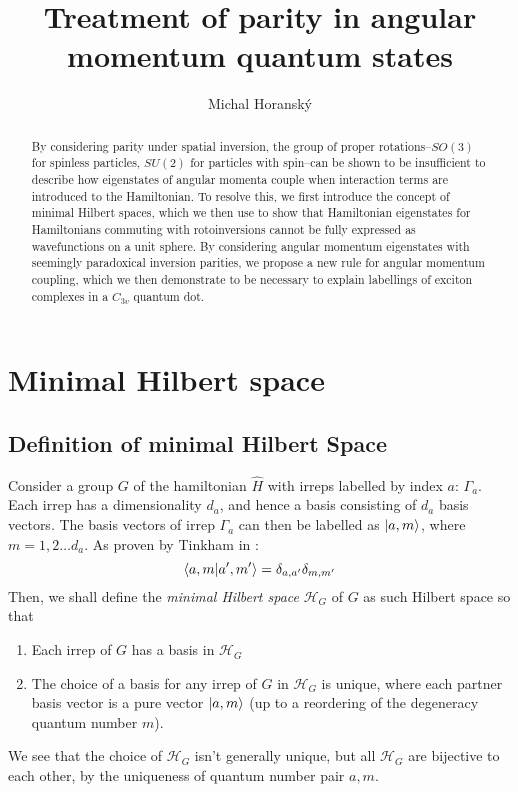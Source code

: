 \documentclass[12pt]{article}
\begin{document}
	\title{Treatment of parity in angular momentum quantum states}
	\author{Michal Horanský}
	\maketitle
	
	\begin{abstract}
	By considering parity under spatial inversion, the group of proper rotations--$SO(3)$ for spinless particles, $SU(2)$ for particles with spin--can be shown to be insufficient to describe how eigenstates of angular momenta couple when interaction terms are introduced to the Hamiltonian. To resolve this, we first introduce the concept of minimal Hilbert spaces, which we then use to show that Hamiltonian eigenstates for Hamiltonians commuting with rotoinversions cannot be fully expressed as wavefunctions on a unit sphere. By considering angular momentum eigenstates with seemingly paradoxical inversion parities, we propose a new rule for angular momentum coupling, which we then demonstrate to be necessary to explain labellings of exciton complexes in a $C_{3v}$ quantum dot.
	\end{abstract}
	
	\section{Minimal Hilbert space}
	
	\subsection{Definition of minimal Hilbert Space}
	
	Consider a group $G$ of the hamiltonian $\hat{H}$ with irreps labelled by index $a$: $\Gamma_a$. Each irrep has a dimensionality $d_a$, and hence a basis consisting of $d_a$ basis vectors. The basis vectors of irrep $\Gamma_a$ can then be labelled as $\ket{a,m}$, where $m=1,2\dots d_a$. As proven by Tinkham in \cite[p.41-2]{tinkham}:
	$$\braket{a,m}{a',m'}=\delta_{a,a'}\delta_{m,m'}$$
	Then, we shall define the \textit{minimal Hilbert space} $\mathcal{H}_G$ of $G$ as such Hilbert space so that
	\begin{enumerate}
	\item Each irrep of $G$ has a basis in $\mathcal{H}_G$
	\item The choice of a basis for any irrep of $G$ in $\mathcal{H}_G$ is unique, where each partner basis vector is a pure vector $\ket{a,m}$ (up to a reordering of the degeneracy quantum number $m$).
	\end{enumerate}
	We see that the choice of $\mathcal{H}_G$ isn't generally unique, but all $\mathcal{H}_G$ are bijective to each other, by the uniqueness of quantum number pair $a,m$.
	
\end{document}
